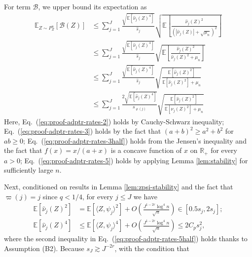 \documentclass[aos]{imsart}
\renewcommand{\hat}{\widehat}
\newcommand{\mB}{\mathcal B}
\theoremstyle{plain}
\theoremstyle{definition}
\theoremstyle{definition}
\begin{document}
\begin{appendix}
For term $\mB$, we upper bound its expectation as
\begin{align}
\mathbb E_{Z\sim P_Z^n}[\mB(Z)] &\leq \sum_{j=1}^{J}\frac{\sqrt{\mathbb E\left[\hat\nu_j(Z)^4\right]}}{\hat s_j}\sqrt{\mathbb E\left[\frac{\hat\nu_j(Z)^2}{(|\hat\nu_j(Z)|+\sqrt{\mu_n})^2}\right]}\label{eq:proof-adptr-rates-2}\\
&\leq\sum_{j=1}^{J}\frac{\sqrt{\mathbb E\left[\hat\nu_j(Z)^4\right]}}{\hat s_j}\sqrt{\mathbb E\left[\frac{\hat\nu_j(Z)^2}{\hat\nu_j(Z)^2+\mu_n}\right]} \label{eq:proof-adptr-rates-3}\\
&\leq \sum_{j=1}^{J}\frac{\sqrt{\mathbb E\left[\hat\nu_j(Z)^4\right]}}{\hat s_j}\sqrt{\frac{\mathbb E[\hat\nu_j(Z)^2]}{\mathbb E[\hat\nu_j(Z)^2]+\mu_n}}\label{eq:proof-adptr-rates-3half}\\
&\leq \sum_{j=1}^{J}\frac{2\sqrt{\mathbb E\left[\hat\nu_j(Z)^4\right]}}{s_{\varrho(j)}}\sqrt{\frac{\mathbb E[\hat\nu_j(Z)^2]}{\mathbb E[\hat\nu_j(Z)^2]+\mu_n}}\label{eq:proof-adptr-rates-4}
\end{align}
Here, Eq.~(\ref{eq:proof-adptr-rates-2}) holds by Cauchy-Schwarz inequality;
Eq.~(\ref{eq:proof-adptr-rates-3}) holds by the fact that $(a+b)^2\geq a^2+b^2$ {for $a b \geq 0$};
Eq.~(\ref{eq:proof-adptr-rates-3half}) holds from the Jensen's inequality and the fact that $f(x)=x/(a+x)$ is a concave function of $x$ on $\mathbb R_+$ for every $a>0$;
Eq.~(\ref{eq:proof-adptr-rates-5}) holds by applying Lemma \ref{lem:stability} for sufficiently large $n$.

Next, conditioned on results in Lemma \ref{lem:zpsi-stability} and the fact that $\varpi(j)=j$ since $q<1/4$, for every $j\leq J$ we have
\begin{align}
\mathbb E[\hat\nu_j(Z)^2] &= \mathbb E[\langle Z,\psi_j\rangle^2] + O\left(\frac{J^{1-2r}\log^4 n}{\sqrt{n}}\right) \in [0.5s_j,2s_j];\label{eq:proof-adptr-rates-5}\\
\mathbb E[\hat\nu_j(Z)^4] &\leq \mathbb E[\langle Z,\psi_j\rangle^4] + O\left(\frac{J^{1-2r}\log^4 n}{\sqrt{n}}\right)\leq 2C_p s_j^2,\label{eq:proof-adptr-rates-5half}
\end{align}
where the second inequality in Eq.~(\ref{eq:proof-adptr-rates-5half}) holds thanks to Assumption (B2).
Because $s_J\gtrsim J^{-2r}$, with the condition that 


\end{appendix}
\end{document}

